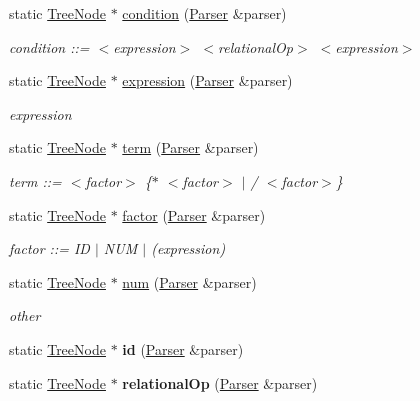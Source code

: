 \begin{DoxyCompactItemize}
static \hyperlink{class_tree_node}{Tree\+Node} $\ast$ \hyperlink{class_rec_des_parser_a22fc9fb779b81433963a29055c0c26b4}{condition} (\hyperlink{class_parser}{Parser} \&parser)
\begin{DoxyCompactList}\small\item\em condition \+:\+:= $<$expression$>$ $<$relational\+Op$>$ $<$expression$>$ \end{DoxyCompactList}\item 
static \hyperlink{class_tree_node}{Tree\+Node} $\ast$ \hyperlink{class_rec_des_parser_a0640caa2edc21da4f7509a2a04c1c132}{expression} (\hyperlink{class_parser}{Parser} \&parser)
\begin{DoxyCompactList}\small\item\em expression \end{DoxyCompactList}\item 
\hypertarget{class_rec_des_parser_a68b94dd34dd185a93bd38a099ba61c97}{}\label{class_rec_des_parser_a68b94dd34dd185a93bd38a099ba61c97} 
static \hyperlink{class_tree_node}{Tree\+Node} $\ast$ \hyperlink{class_rec_des_parser_a68b94dd34dd185a93bd38a099ba61c97}{term} (\hyperlink{class_parser}{Parser} \&parser)
\begin{DoxyCompactList}\small\item\em term \+:\+:= $<$factor$>$ \{$\ast$ $<$factor$>$ $\vert$ / $<$factor$>$\} \end{DoxyCompactList}\item 
static \hyperlink{class_tree_node}{Tree\+Node} $\ast$ \hyperlink{class_rec_des_parser_ae31030c069102efd0d77aa7c187a142d}{factor} (\hyperlink{class_parser}{Parser} \&parser)
\begin{DoxyCompactList}\small\item\em factor \+:\+:= ID $\vert$ N\+UM $\vert$ (expression) \end{DoxyCompactList}\item 
static \hyperlink{class_tree_node}{Tree\+Node} $\ast$ \hyperlink{class_rec_des_parser_ab539a62bb94dce661135cebd96a45711}{num} (\hyperlink{class_parser}{Parser} \&parser)
\begin{DoxyCompactList}\small\item\em other \end{DoxyCompactList}\item 
\hypertarget{class_rec_des_parser_ae600e80953535ff51c9c5f8b0608a0f6}{}\label{class_rec_des_parser_ae600e80953535ff51c9c5f8b0608a0f6} 
static \hyperlink{class_tree_node}{Tree\+Node} $\ast$ {\bfseries id} (\hyperlink{class_parser}{Parser} \&parser)
\item 
\hypertarget{class_rec_des_parser_acfe537816711451af568ba5c4fa461cb}{}\label{class_rec_des_parser_acfe537816711451af568ba5c4fa461cb} 
static \hyperlink{class_tree_node}{Tree\+Node} $\ast$ {\bfseries relational\+Op} (\hyperlink{class_parser}{Parser} \&parser)
\end{DoxyCompactItemize}


